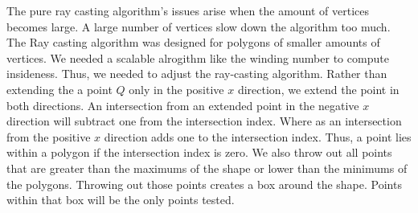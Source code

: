 \documentclass{article}
\begin{document}
The pure ray casting algorithm's issues arise when the amount of vertices becomes large.
A large number of vertices slow down the algorithm too much.
The Ray casting algorithm was designed for polygons of smaller amounts of vertices.
We needed a scalable alrogithm like the winding number to compute insideness.
Thus, we needed to adjust the ray-casting algorithm.
Rather than extending the a point $Q$ only in the positive $x$ direction, we extend the point in both directions.
An intersection from an extended point in the negative $x$ direction will subtract one from the intersection index.
Where as an intersection from the positive $x$ direction adds one to the intersection index.
Thus, a point lies within a polygon if the intersection index is zero.
We also throw out all points that are greater than the maximums of the shape or lower than the minimums of the polygons.
Throwing out those points creates a box around the shape.
Points within that box will be the only points tested.






{}

\end{document}
